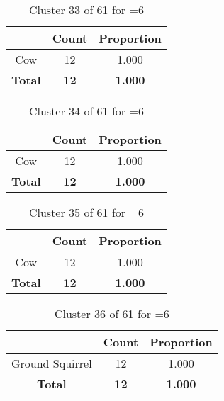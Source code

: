 \begin{table}[ht!]
\centering
\begin{tabular}{|c|c|c|}
\hline
\bf \Spec{} &\bf Count &\bf Proportion\\ \hline \hline
Cow & 12 & 1.000\\ \hline
\hline
\bf Total & \bf 12 & \bf 1.000\\ \hline
\end{tabular}
\label{tab:cluster:33:6}
\caption{Cluster 33 of 61 for \minneigh{}=6}
\end{table}

\begin{table}[ht!]
\centering
\begin{tabular}{|c|c|c|}
\hline
\bf \Spec{} &\bf Count &\bf Proportion\\ \hline \hline
Cow & 12 & 1.000\\ \hline
\hline
\bf Total & \bf 12 & \bf 1.000\\ \hline
\end{tabular}
\label{tab:cluster:34:6}
\caption{Cluster 34 of 61 for \minneigh{}=6}
\end{table}

\begin{table}[ht!]
\centering
\begin{tabular}{|c|c|c|}
\hline
\bf \Spec{} &\bf Count &\bf Proportion\\ \hline \hline
Cow & 12 & 1.000\\ \hline
\hline
\bf Total & \bf 12 & \bf 1.000\\ \hline
\end{tabular}
\label{tab:cluster:35:6}
\caption{Cluster 35 of 61 for \minneigh{}=6}
\end{table}

\begin{table}[ht!]
\centering
\begin{tabular}{|c|c|c|}
\hline
\bf \Spec{} &\bf Count &\bf Proportion\\ \hline \hline
Ground Squirrel & 12 & 1.000\\ \hline
\hline
\bf Total & \bf 12 & \bf 1.000\\ \hline
\end{tabular}
\label{tab:cluster:36:6}
\caption{Cluster 36 of 61 for \minneigh{}=6}
\end{table}

